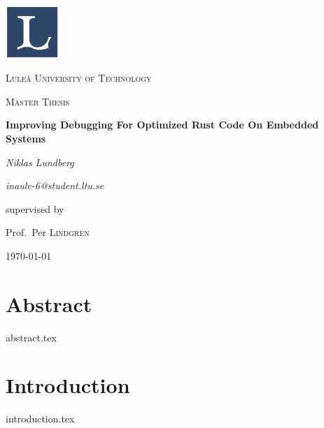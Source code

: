 \documentclass[12pt, a4paper]{book}
\begin{document}
%

\begin{titlepage}
    \centering
    \includegraphics[width=0.15\textwidth]{ltulogo.png}\par\vspace{1cm}
    {\scshape\LARGE Luleå University of Technology\par}
    \vspace{1cm}
    {\scshape\Large Master Thesis\par}
    \vspace{1.5cm}
    {\huge\bfseries Improving Debugging For Optimized Rust Code On Embedded Systems\par}
    \vspace{2cm}
    {\Large\textit{Niklas Lundberg}\par}
    {\Large\textit{inaule-6@student.ltu.se}\par}
    \vfill
    supervised by\par
    Prof.~Per \textsc{Lindgren}
    \vfill
    {\large \today\par}
\end{titlepage}


\chapter*{Abstract}
\label{sec:abstract}
{abstract.tex}

\tableofcontents 
\clearpage

\listoffigures
\clearpage


\chapter{Introduction}
\label{sec:introfuction}
{introduction.tex}
\end{document}
